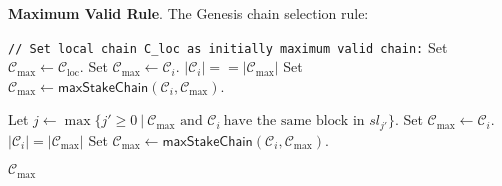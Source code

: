 \bigbreak
\bigbreak
\noindent
{}
\textbf{Maximum Valid Rule}.\label{apndx:max-valid-rule}
The Genesis chain selection rule:
\begin{algo}
    \caption{${\textsf{maxValidChain}(\mathcal{C}_{\text{loc}}, \mathbf{N} = \{\mathcal{C}_i\}_{i=1}^N, K_{\text{f}}, K_{\text{g}})}$}
    \begin{algorithmic}[1]
        \noindent
        \lstinline|// Set local chain C_loc as initially maximum valid chain:|
        \State Set ${\mathcal{C}_{\max} \leftarrow \mathcal{C}_{\text{loc}}}$.
                    \State Set ${\mathcal{C}_{\max} \leftarrow \mathcal{C}_{i}}$.
                \ElsIf
                        {$|\mathcal{C}_i| == |\mathcal{C}_{\max}|$}
                    \State Set ${\mathcal{C}_{\max} \leftarrow \textsf{maxStakeChain}(\mathcal{C}_{i}, \mathcal{C}_{\max})}$.

                \EndIf
            \Else

                \State Let ${j  \leftarrow \max \{j' \geq 0 \ |\  \mathcal{C}_{\max} \text{ and } \mathcal{C}_{i} \
                \text{have the same block in } sl_{j'}\}}$.
                    \State Set ${\mathcal{C}_{\max} \leftarrow \mathcal{C}_{i}}$.
                \ElsIf
                        {$|\mathcal{C}_i| = |\mathcal{C}_{\max}|$}
                    \State Set ${\mathcal{C}_{\max} \leftarrow \textsf{maxStakeChain}(\mathcal{C}_{i}, \mathcal{C}_{\max})}$.
                \EndIf
            \EndIf

        \EndFor
        \State \Return ${\mathcal{C}_{\max}}$
    \end{algorithmic}\label{alg:max-valid-rule}
\end{algo}

